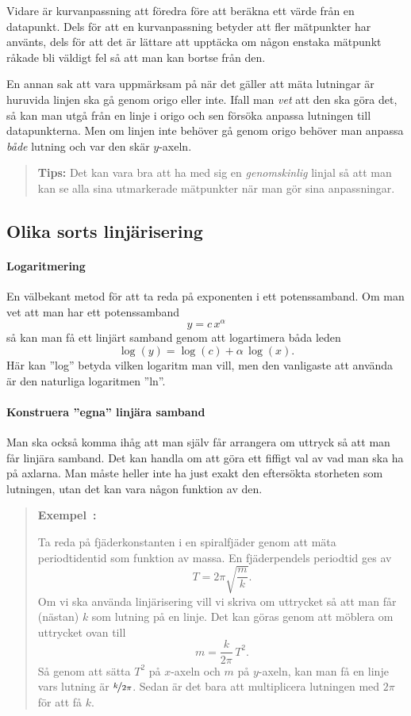 \documentclass[11pt,a4paper, swedish
]{article}
\newcounter{exempel_counter}%
\newenvironment{exempel}
{
  \refstepcounter{exempel_counter}
  \begin{quote}
  \noindent\textbf{Exempel~\arabic{exempel_counter}:}
}{
  \end{quote}
}
\begin{document}
Vidare är kurvanpassning att föredra före att beräkna ett värde från
en datapunkt. Dels för att en kurvanpassning betyder att
fler mätpunkter har använts, dels för att det är lättare att upptäcka
om någon enstaka mätpunkt råkade bli väldigt fel så att man kan bortse
från den. 

En annan sak att vara uppmärksam på när det gäller att mäta lutningar
är huruvida linjen ska gå genom origo eller inte. Ifall man \emph{vet}
att den ska göra det, så kan man utgå från en linje i origo och sen
försöka anpassa lutningen till datapunkterna. Men om linjen inte
behöver gå genom origo behöver man anpassa \emph{både} lutning och var
den skär $y$-axeln. 


\begin{quote}
  \textbf{Tips: } Det kan vara bra att ha med sig en
  \emph{genomskinlig} linjal så att man kan se alla sina utmarkerade
  mätpunkter när man gör sina anpassningar. 
\end{quote}


\subsection{Olika sorts linjärisering}
\paragraph{Logaritmering}
En välbekant metod för att ta reda på exponenten i ett
potenssamband. Om man vet att man har ett potenssamband
\begin{equation}
y=c\,x^\alpha
\end{equation}
så kan man få ett linjärt samband genom att logartimera båda leden
\begin{equation}
\log(y) = \log(c) + \alpha\,\log(x).
\end{equation}
Här kan ''log'' betyda vilken logaritm man vill, men den vanligaste
att använda är den naturliga logaritmen ''ln''. 

\paragraph{Konstruera ''egna'' linjära samband}
Man ska också komma ihåg att man själv får arrangera om uttryck så att
man får linjära samband. Det kan handla om att göra ett fiffigt val av
vad man ska ha på axlarna. Man måste heller inte ha just exakt den
eftersökta storheten som lutningen, utan det kan vara någon funktion
av den.

\begin{exempel}
Ta reda på fjäderkonstanten i en spiralfjäder genom att mäta periodtidentid
som funktion av massa. En fjäderpendels periodtid ges av
\[
T=2\pi\sqrt{\frac{m}{k}}.
\]
Om vi ska använda linjärisering vill vi skriva om uttrycket så att man
får (nästan) $k$ som lutning på en linje. Det kan göras genom att möblera om
uttrycket ovan till
\[
m=\frac{k}{2\pi}\,T^2.
\]
Så genom att sätta $T^2$ på $x$-axeln och $m$ på $y$-axeln, kan man få
en linje vars lutning är $\nicefrac{k}{2\pi}$. Sedan är det bara att
multiplicera lutningen med $2\pi$ för att få $k$.
\end{exempel}
\end{document}
